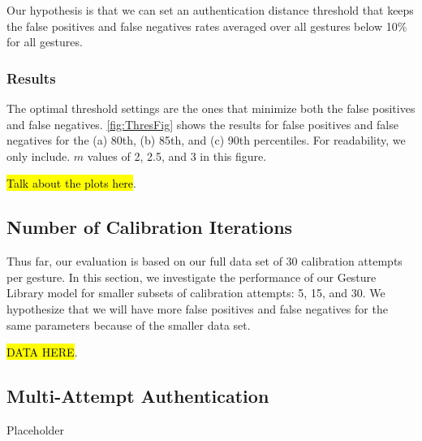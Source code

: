 Our hypothesis is that we can set an authentication distance threshold that keeps the false positives and false negatives rates averaged over all gestures below 10\% for all gestures.

\subsubsection{Results}

The optimal threshold settings are the ones that minimize both the false positives and false negatives. \autoref{fig:ThresFig} shows the results for false positives and false negatives for the (a) 80th, (b) 85th, and (c) 90th percentiles. For readability, we only include. $m$ values of 2, 2.5, and 3 in this figure.

\hl{Talk about the plots here}.

\subsection{Number of Calibration Iterations}

Thus far, our evaluation is based on our full data set of 30 calibration attempts per gesture. In this section, we investigate the performance of our Gesture Library model for smaller subsets of calibration attempts: 5, 15, and 30. We hypothesize that we will have more false positives and false negatives for the same parameters because of the smaller data set.

\hl{DATA HERE}.

\subsection{Multi-Attempt Authentication}

Placeholder

 

